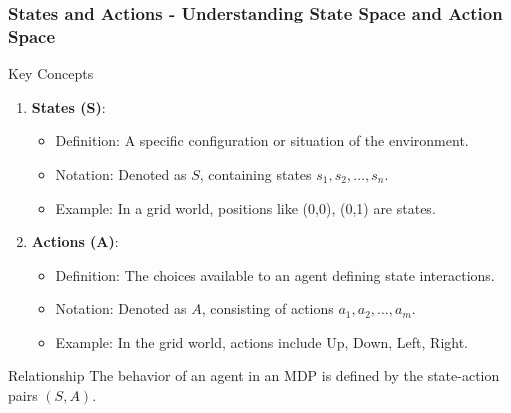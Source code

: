 \documentclass[aspectratio=169]{beamer}
\begin{document}
\begin{frame}[fragile]
    \frametitle{States and Actions - Understanding State Space and Action Space}
    
    \begin{block}{Key Concepts}
        \begin{enumerate}
            \item \textbf{States (S)}:
            \begin{itemize}
                \item Definition: A specific configuration or situation of the environment.
                \item Notation: Denoted as \( S \), containing states \( s_1, s_2, \ldots, s_n \).
                \item Example: In a grid world, positions like (0,0), (0,1) are states.
            \end{itemize}
            
            \item \textbf{Actions (A)}:
            \begin{itemize}
                \item Definition: The choices available to an agent defining state interactions.
                \item Notation: Denoted as \( A \), consisting of actions \( a_1, a_2, \ldots, a_m \).
                \item Example: In the grid world, actions include Up, Down, Left, Right.
            \end{itemize}
        \end{enumerate}
    \end{block}
    
    \begin{block}{Relationship}
        The behavior of an agent in an MDP is defined by the state-action pairs \( (S, A) \).
    \end{block}
\end{frame}
\end{document}
